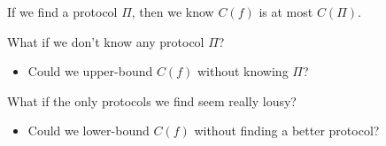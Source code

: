 If we find a protocol $\Pi$,
	then we know $C(f)$ is at most $C(\Pi)$.
\pause

What if we don't know any protocol $\Pi$?
\pause
\begin{itemize}
	\item Could we upper-bound $C(f)$ without knowing $\Pi$?
\end{itemize}

\pause
What if the only protocols we find seem really lousy?
\pause
\begin{itemize}
	\item Could we lower-bound $C(f)$ without finding a better protocol?
\end{itemize}

\pause
{}